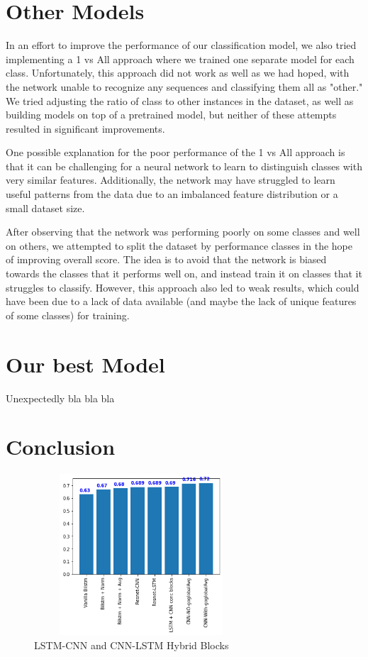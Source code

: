 \documentclass[11pt]{article}
\begin{document}
\section{Other Models}
In an effort to improve the performance of our classification model, we also tried implementing a 1 vs All approach where we trained one separate model for each class.
Unfortunately, this approach did not work as well as we had hoped, with the network unable to recognize any sequences and classifying them all as "other."
We tried adjusting the ratio of class to other instances in the dataset, as well as building models on top of a pretrained model, but neither of these attempts resulted in significant improvements.

One possible explanation for the poor performance of the 1 vs All approach is that it can be challenging for a neural network to learn to distinguish
classes with very similar features.
Additionally, the network may have struggled to learn useful patterns from the data due to an imbalanced feature distribution or a small dataset size.

After observing that the network was performing poorly on some classes and well on others, we attempted to split the dataset by performance classes in the hope of improving overall score.
The idea is to avoid that the network is biased towards the classes that it performs well on, and instead train it on classes that it struggles to classify.
However, this approach also led to weak results, which could have been due to a lack of data available (and maybe the lack of unique features of some classes) for training.

\section{Our best Model}
Unexpectedly bla bla bla





\section{Conclusion}

\begin{figure}[h]
  \centering
  \includegraphics[width=8cm, height=6cm]{chart}
  \caption{LSTM-CNN and CNN-LSTM Hybrid Blocks}
\end{figure}


\end{document}
